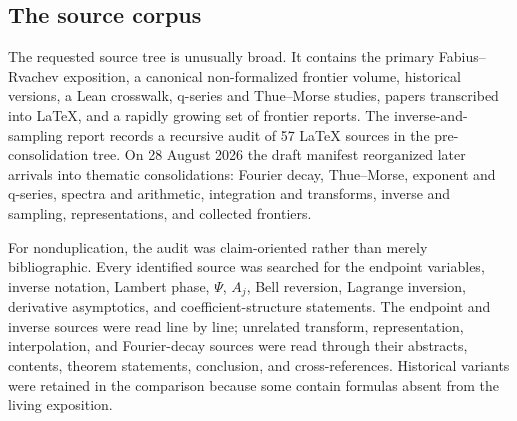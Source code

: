\documentclass[11pt,oneside]{article}
\numberwithin{equation}{section}
\theoremstyle{definition}
\theoremstyle{remark}
\begin{document}
\subsection{The source corpus}
The requested source tree is unusually broad.  It contains the primary Fabius--Rvachev exposition, a canonical non-formalized frontier volume, historical versions, a Lean crosswalk, q-series and Thue--Morse studies, papers transcribed into LaTeX, and a rapidly growing set of frontier reports.  The inverse-and-sampling report records a recursive audit of 57 LaTeX sources in the pre-consolidation tree.  On 28 August 2026 the draft manifest reorganized later arrivals into thematic consolidations: Fourier decay, Thue--Morse, exponent and q-series, spectra and arithmetic, integration and transforms, inverse and sampling, representations, and collected frontiers.

For nonduplication, the audit was claim-oriented rather than merely bibliographic.  Every identified source was searched for the endpoint variables, inverse notation, Lambert phase, $\Psi$, $A_j$, Bell reversion, Lagrange inversion, derivative asymptotics, and coefficient-structure statements.  The endpoint and inverse sources were read line by line; unrelated transform, representation, interpolation, and Fourier-decay sources were read through their abstracts, contents, theorem statements, conclusion, and cross-references.  Historical variants were retained in the comparison because some contain formulas absent from the living exposition.
\end{document}
